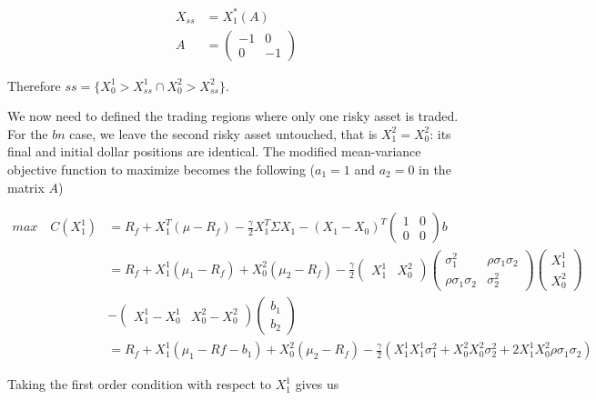 \documentclass[10pt]{article}
\begin{document}
\begin{align*}
		X_{ss} &= X_1^*(A) \\
	A &=  \begin{pmatrix}
	-1 & 0\\	
	0 & -1
\end{pmatrix}
\end{align*}

Therefore $ss = \{X_0^1 > X_{ss}^1 \cap  X_0^2 > X_{ss}^2\}$.

\bigbreak

We now need to defined the trading regions where only one risky asset is traded. For the $bn$ case, we leave the second risky asset untouched, that is $X_1^2 = X_0^2$: its final and initial dollar positions are identical. The modified mean-variance objective function to maximize becomes the following ($a_1 = 1$ and $a_2 = 0$ in the matrix $A$)

\begin{align*}
	max \quad C(X_1^1) &= R_f + X_1^T(\mu - R_f) - \frac{\gamma}{2}X_1^T\Sigma X_1 - (X_1 - X_0)^T \begin{pmatrix}
	1 & 0\\	
	0 & 0
\end{pmatrix} b \\
&= R_f + X_1^1(\mu_1 - R_f) + X_0^2(\mu_2 - R_f) - \frac{\gamma}{2}  \begin{pmatrix}
	X_1^1 & X_0^2
\end{pmatrix} \begin{pmatrix}
	\sigma_1^2 & \rho \sigma_1 \sigma_2\\	
	\rho \sigma_1 \sigma_2 & \sigma_2^2
\end{pmatrix} \begin{pmatrix}
	X_1^1 \\	
	X_0^2 
\end{pmatrix} \\
& - \begin{pmatrix}
	X_1^1 - X_0^1 & X_0^2 - X_0^2
\end{pmatrix} \begin{pmatrix}
	b_1 \\	
	b_2 
\end{pmatrix}\\
&= R_f + X_1^1(\mu_1 - Rf - b_1) + X_0^2(\mu_2 - R_f) - \frac{\gamma}{2}\left( X_1^1 X_1^1 \sigma_1^2 + X_0^2 X_0^2 \sigma_2^2 + 2 X_1^1X_0^2\rho \sigma_1 \sigma_2 \right)
\end{align*}

Taking the first order condition with respect to $X_1^1$ gives us
\end{document}
